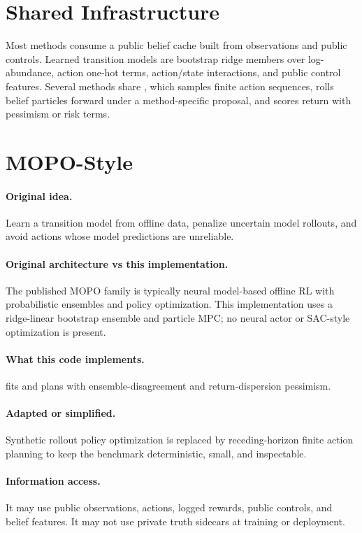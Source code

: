 \documentclass[11pt]{article}
\begin{document}
\section{Shared Infrastructure}

Most methods consume a public belief cache built from observations and public
controls. Learned transition models are bootstrap ridge members over
log-abundance, action one-hot terms, action/state interactions, and public
control features. Several methods share , which samples finite
action sequences, rolls belief particles forward under a method-specific
proposal, and scores return with pessimism or risk terms.

\section{MOPO-Style}

\paragraph{Original idea.}
Learn a transition model from offline data, penalize uncertain model rollouts,
and avoid actions whose model predictions are unreliable.

\paragraph{Original architecture vs this implementation.}
The published MOPO family is typically neural model-based offline RL with
probabilistic ensembles and policy optimization. This implementation uses a
ridge-linear bootstrap ensemble and particle MPC; no neural actor or SAC-style
optimization is present.

\paragraph{What this code implements.}
 fits  and plans with
ensemble-disagreement and return-dispersion pessimism.

\paragraph{Adapted or simplified.}
Synthetic rollout policy optimization is replaced by receding-horizon finite
action planning to keep the benchmark deterministic, small, and inspectable.

\paragraph{Information access.}
It may use public observations, actions, logged rewards, public controls, and
belief features. It may not use private truth sidecars at training or
deployment.
\end{document}
